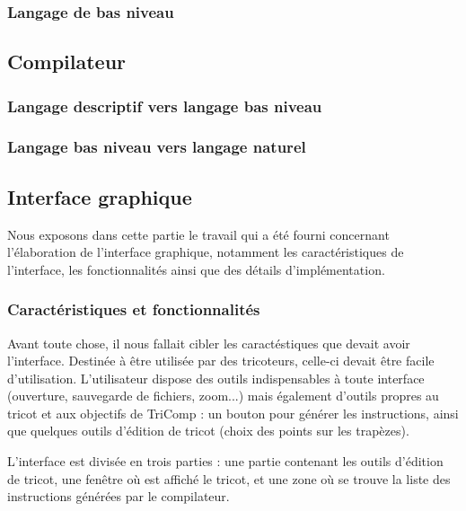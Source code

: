 \documentclass{article}
\begin{document}

\subsubsection{Langage de bas niveau}

\subsection{Compilateur}

\subsubsection{Langage descriptif vers langage bas niveau}

\subsubsection{Langage bas niveau vers langage naturel}

\subsection{Interface graphique}

Nous exposons dans cette partie le travail qui a été fourni concernant l'élaboration de l'interface graphique, notamment les caractéristiques de l'interface, les fonctionnalités ainsi que des détails d'implémentation.

\subsubsection{Caractéristiques et fonctionnalités}

Avant toute chose, il nous fallait cibler les caractéstiques que devait avoir l'interface. Destinée à être utilisée par des tricoteurs, celle-ci devait être facile d'utilisation. L'utilisateur dispose des outils indispensables à toute interface (ouverture, sauvegarde de fichiers, zoom...) mais également d'outils propres au tricot et aux objectifs de TriComp : un bouton pour générer les instructions, ainsi que quelques outils d'édition de tricot (choix des points sur les trapèzes).

L'interface est divisée en trois parties : une partie contenant les outils d'édition de tricot, une fenêtre où est affiché le tricot, et une zone où se trouve la liste des instructions générées par le compilateur.
\end{document}
